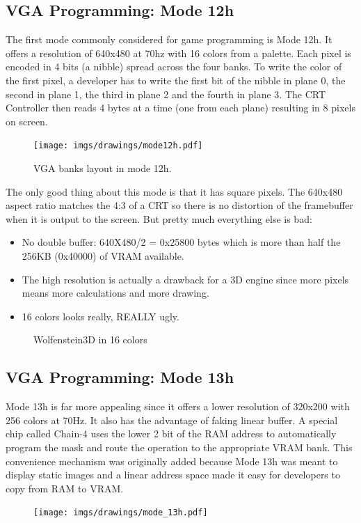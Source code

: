 \documentclass[book.tex]{subfiles}
\begin{document}
 \subsection{VGA Programming: Mode 12h}
 The first mode commonly considered for game programming is Mode 12h. It offers a resolution of 640x480 at 70hz with 16 colors from a palette. Each pixel is encoded in 4 bits (a nibble) spread across the four banks. To write the color of the first pixel, a developer has to write the first bit of the nibble in plane 0, the second in plane 1, the third in plane 2 and the fourth in plane 3. The CRT Controller then reads 4 bytes at a time (one from each plane) resulting in 8 pixels on screen.\\
\par
\begin{figure}[H]
\centering
 \texttt{[image: imgs/drawings/mode12h.pdf]}
\caption{VGA banks layout in mode 12h.}
\end{figure}
\par

The only good thing about this mode is that it has square pixels. The 640x480 aspect ratio matches the 4:3 of a CRT so there is no distortion of the framebuffer when it is output to the screen. But pretty much everything else is bad:\\
\begin{itemize}
\item No double buffer: 640X480/2 = 0x25800 bytes which is more than half the 256KB (0x40000) of VRAM available.
\item The high resolution is actually a drawback for a 3D engine since more pixels means more calculations and more drawing.
\item 16 colors looks really, REALLY ugly.
\end{itemize}

 \begin{figure}[H]
\centering
 \caption{Wolfenstein3D in 16 colors}
\end{figure}





 
  \subsection{VGA Programming: Mode 13h}
  Mode 13h is far more appealing since it offers a lower resolution of 320x200 with 256 colors at 70Hz. It also has the advantage of faking linear buffer. A special chip called Chain-4 uses the lower 2 bit of the RAM address to automatically program the mask and route the operation to the appropriate VRAM bank. This convenience mechanism was originally added because Mode 13h was meant to display static images and a linear address space made it easy for developers to copy from RAM to VRAM.\\
  \par
 \begin{figure}[H]
\centering
      \texttt{[image: imgs/drawings/mode\_13h.pdf]}
\end{figure}
\par
\end{document}
